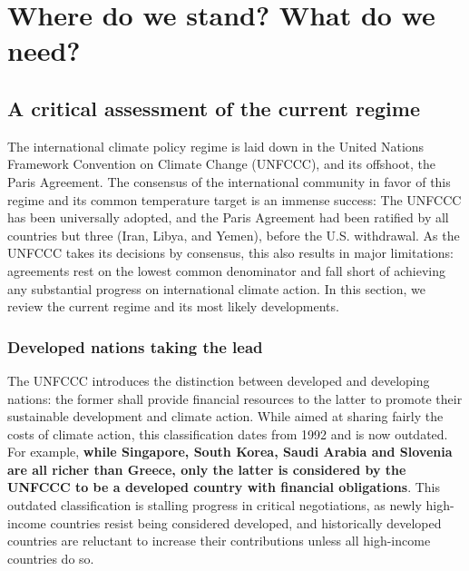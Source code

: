 \documentclass[12pt,english]{article}
\makeatletter
\renewcommand\tableofcontents{%
    \@starttoc{toc}%
}
\makeatother
\begin{document}
\clearpage
\tableofcontents


\clearpage


\section{Where do we stand? What do we need?\label{sec:now}}%


\subsection{A critical assessment of the current regime\label{subsec:criticism}}

The international climate policy regime is laid down in the United Nations Framework Convention on Climate Change (UNFCCC), and its offshoot, the Paris Agreement. The consensus of the international community in favor of this regime and its common  temperature target is an immense success: The UNFCCC has been universally adopted, and the Paris Agreement had been ratified by all countries but three (Iran, Libya, and Yemen), before the U.S. withdrawal. As the UNFCCC takes its decisions by consensus, this also results in major limitations: agreements rest on the lowest common denominator and fall short of achieving any substantial progress on international climate action. In this section, we review the current regime and its most likely developments.

\subsubsection{Developed nations taking the lead\label{subsubsec:developed}}
The UNFCCC introduces the distinction between developed and developing nations: the former shall provide financial resources to the latter to promote their sustainable development and climate action. While aimed at sharing fairly the costs of climate action, this classification dates from 1992 and is now outdated. For example, \textbf{while Singapore, South Korea, Saudi Arabia and Slovenia are all richer than Greece, only the latter is considered by the UNFCCC to be a developed country with financial obligations}. This outdated classification is stalling progress in critical negotiations, as newly high-income countries resist being considered developed, and historically developed countries are reluctant to increase their contributions unless all high-income countries do so.
\end{document}

